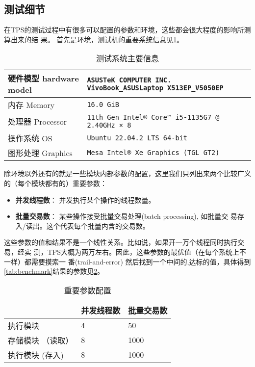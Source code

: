 \documentclass[dvipsnames]{ctexart}
\begin{document}
\subsection{测试细节}
\label{sec:benchmark-detail}
在TPS的测试过程中有很多可以配置的参数和环境，这些都会很大程度的影响所测算出来的结
果。
\FloatBarrier
首先是环境，测试机的重要系统信息见\cref{tab:sysinfo}。
\begin{table}
  \centering
  \begin{tabularx}{0.8\linewidth}{mX}
    \toprule
    硬件模型 hardware model& \texttt{ASUSTeK COMPUTER INC. VivoBook\_ASUSLaptop X513EP\_V5050EP}\\ \hline
    内存 Memory & \texttt{16.0 GiB}\\ \hline
    处理器 Processor & \texttt{11th Gen Intel® Core™ i5-1135G7 @ 2.40GHz × 8}\\ \hline
    操作系统 OS& \texttt{Ubuntu 22.04.2 LTS 64-bit}\\ \hline
    图形处理 Graphics& \texttt{Mesa Intel® Xe Graphics (TGL GT2)}\\
    \bottomrule
  \end{tabularx}
  \caption{测试系统主要信息}
  \label{tab:sysinfo}
\end{table}
\FloatBarrier

除环境以外还有的就是一些模块内部参数的配置，这里我们只列出来两个比较广义的（每个模块都有的）重要参数：
\begin{itemize}
\item \textbf{并发线程数}： 并发执行某个操作的线程数量。
\item \textbf{批量交易数}： 某些操作接受批量交易处理(batch processing), 如批量交
  易存入/读出。这个代表每个批量内含的交易数。
\end{itemize}
这些参数的值和结果不是一个线性关系。比如说，如果开一万个线程同时执行交易，经实
测，TPS大概为两万左右。因此，这些参数的最优值（在每个系统上不一样）都需要摸索一
番(trail-and-error) 然后找到一个中间的,达标的值，具体得到\cref{tab:benchmark}结果的参数见\cref{tab:paraminfo}。
\begin{table}[h]
  \centering
  \begin{tabularx}{0.8\linewidth}{XXX}
    \toprule
    & 并发线程数 & 批量交易数 \\
    \midrule
    执行模块        &4&50\\
    存储模块 （读取）&8&1000\\
    执行模块  (存入)&8&1000\\
    \bottomrule
  \end{tabularx}
  \caption{重要参数配置}
  \label{tab:paraminfo}
\end{table}
\newpage{}
\end{document}

